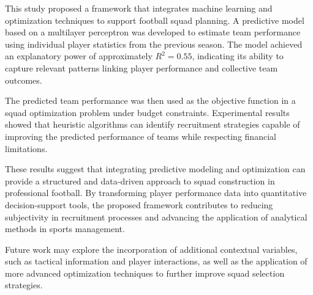 \documentclass[a4paper,fleqn]{cas-sc}
\begin{document}
This study proposed a framework that integrates machine learning and optimization techniques to support football squad planning. A predictive
model based on a multilayer perceptron was developed to estimate team performance using individual player statistics from the previous season.
The model achieved an explanatory power of approximately $R^2 = 0.55$, indicating its ability to capture relevant patterns linking player
performance and collective team outcomes.

The predicted team performance was then used as the objective function in a squad optimization problem under budget constraints. Experimental
results showed that heuristic algorithms can identify recruitment strategies capable of improving the predicted performance of teams while
respecting financial limitations.

These results suggest that integrating predictive modeling and optimization can provide a structured and data-driven approach to squad
construction in professional football. By transforming player performance data into quantitative decision-support tools, the proposed
framework contributes to reducing subjectivity in recruitment processes and advancing the application of analytical methods in sports
management.

Future work may explore the incorporation of additional contextual variables, such as tactical information and player interactions, as well
as the application of more advanced optimization techniques to further improve squad selection strategies.



\end{document}
